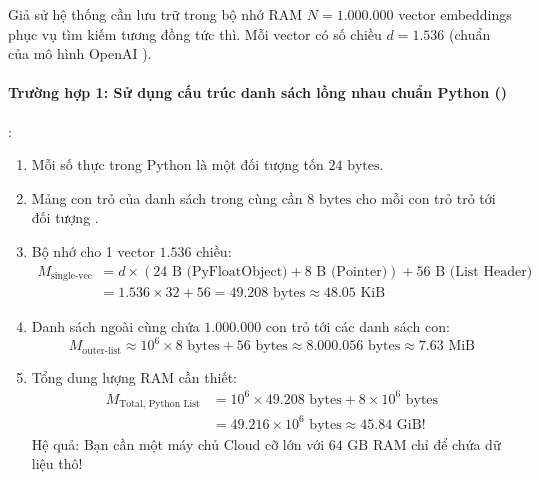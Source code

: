\begin{example}
\label{ex:memory-vectors}
Giả sử hệ thống cần lưu trữ trong bộ nhớ RAM $N = 1.000.000$ vector embeddings phục vụ tìm kiếm tương đồng tức thì. Mỗi vector có số chiều $d = 1.536$ (chuẩn của mô hình OpenAI ).

\paragraph{Trường hợp 1: Sử dụng cấu trúc danh sách lồng nhau chuẩn Python ()}:
\begin{enumerate}
  \item Mỗi số thực trong Python là một đối tượng  tốn $24\text{ bytes}$.
  \item Mảng con trỏ của danh sách trong cùng cần $8\text{ bytes}$ cho mỗi con trỏ trỏ tới đối tượng .
  \item Bộ nhớ cho 1 vector $1.536$ chiều:
  \begin{align*}
  M_{\text{single-vec}} &= d \times (24\text{ B (PyFloatObject)} + 8\text{ B (Pointer)}) + 56\text{ B (List Header)} \\
  &= 1.536 \times 32 + 56 = 49.208\text{ bytes} \approx 48.05\text{ KiB}
  \end{align*}
  \item Danh sách ngoài cùng chứa $1.000.000$ con trỏ tới các danh sách con:
  \begin{equation*}
  M_{\text{outer-list}} \approx 10^6 \times 8\text{ bytes} + 56\text{ bytes} \approx 8.000.056\text{ bytes} \approx 7.63\text{ MiB}
  \end{equation*}
  \item Tổng dung lượng RAM cần thiết:
  \begin{align*}
  M_{\text{Total, Python List}} &= 10^6 \times 49.208\text{ bytes} + 8\times 10^6\text{ bytes} \\
  &= 49.216 \times 10^6\text{ bytes} \approx 45.84\text{ GiB}!
  \end{align*}
  Hệ quả: Bạn cần một máy chủ Cloud cỡ lớn với $64\text{ GB}$ RAM chỉ để chứa dữ liệu thô!
\end{enumerate}


\end{example}
